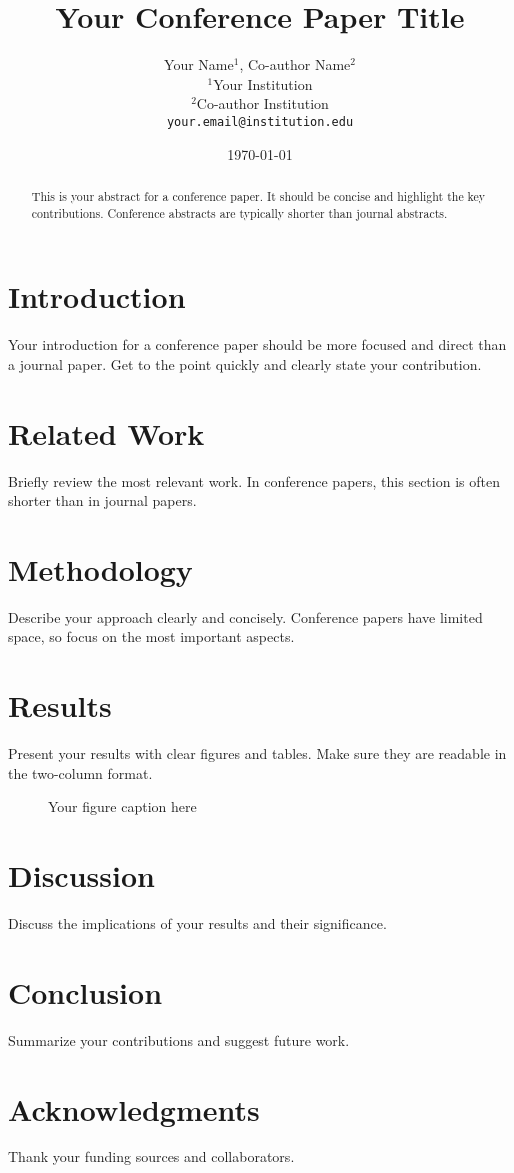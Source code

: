 \documentclass[10pt,twocolumn]{article}
\title{Your Conference Paper Title}
\author{Your Name$^1$, Co-author Name$^2$ \\
        $^1$Your Institution \\
        $^2$Co-author Institution \\
        \texttt{your.email@institution.edu}}
\date{\today}
\begin{document}
\maketitle

\begin{abstract}
This is your abstract for a conference paper. It should be concise and highlight the key contributions. Conference abstracts are typically shorter than journal abstracts.
\end{abstract}

\section{Introduction}
Your introduction for a conference paper should be more focused and direct than a journal paper. Get to the point quickly and clearly state your contribution.

\section{Related Work}
Briefly review the most relevant work. In conference papers, this section is often shorter than in journal papers.

\section{Methodology}
Describe your approach clearly and concisely. Conference papers have limited space, so focus on the most important aspects.

\section{Results}
Present your results with clear figures and tables. Make sure they are readable in the two-column format.

\begin{figure}[h]
\centering
\caption{Your figure caption here}
\label{fig:example}
\end{figure}

\section{Discussion}
Discuss the implications of your results and their significance.

\section{Conclusion}
Summarize your contributions and suggest future work.

\section*{Acknowledgments}
Thank your funding sources and collaborators.




\balance
\end{document}
